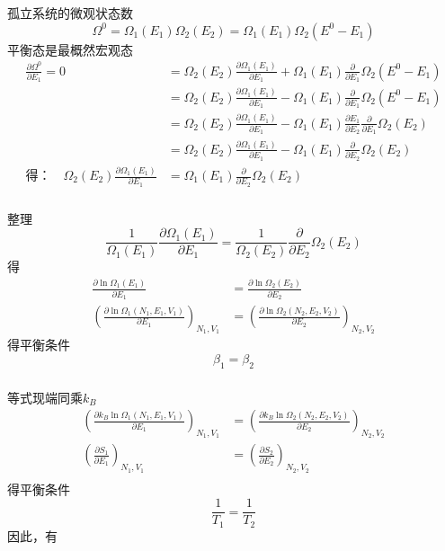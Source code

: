 \begin{frame}
  \frametitle{}
  孤立系统的微观状态数
  \[ \Omega^0 = \Omega _1 (E_1)\Omega _2 (E_2) = \Omega _1 (E_1)\Omega _2 (E^0 - E_1) \]
  平衡态是最概然宏观态
  \[ 
  \begin{aligned}
   \frac{\partial \Omega^0 }{\partial E_1 } =0 &= \Omega _2 (E_2) \frac{\partial \Omega _1 (E_1) }{\partial E_1 }  + \Omega _1 (E_1)\frac{\partial }{\partial E_1 }\Omega _2 (E^0 - E_1) \\
   &= \Omega _2 (E_2) \frac{\partial \Omega _1 (E_1) }{\partial E_1 }  - \Omega _1 (E_1)\frac{\partial }{\partial E_1 }\Omega _2 (E^0 - E_1) \\
   &= \Omega _2 (E_2) \frac{\partial \Omega _1 (E_1) }{\partial E_1 }  - \Omega _1 (E_1) \frac{\partial E_1 }{\partial E_2 } \frac{\partial }{\partial E_1 }\Omega _2 (E_2)  \\
   &=  \Omega _2 (E_2) \frac{\partial \Omega _1 (E_1) }{\partial E_1 }  - \Omega _1 (E_1) \frac{\partial }{\partial E_2 }\Omega _2 (E_2)  \\
  \text{得：} \quad \Omega _2 (E_2) \frac{\partial \Omega _1 (E_1) }{\partial E_1 }  &= \Omega _1 (E_1) \frac{\partial }{\partial E_2 }\Omega _2 (E_2) 
  \end{aligned}\]
\end{frame} 

\begin{frame}
  \frametitle{}
整理
$$
 \frac{1}{\Omega _1 (E_1) }\frac{\partial \Omega _1 (E_1) }{\partial E_1 }  = \frac{1}{\Omega _2 (E_2)} \frac{\partial }{\partial E_2 }\Omega _2 (E_2) 
$$ 
得
$$
\begin{aligned}
\frac{\partial \ln \Omega _1 (E_1) }{\partial E_1 }  &= \frac{\partial \ln \Omega _2 (E_2)}{\partial E_2 } 
\\ 
\left(\frac{\partial \ln \Omega _1 (N_1,E_1,V_1) }{\partial E_1 }\right)_{N_1,V_1}  &= \left(\frac{\partial \ln \Omega _2 (N_2,E_2,V_2)}{\partial E_2 } \right)_{N_2,V_2}  
\end{aligned}$$ 
得平衡条件 
\[ \beta _1 = \beta _2\]
\end{frame} 

\begin{frame}
  \frametitle{}
  等式现端同乘$k_B$
  $$
  \begin{aligned}
  \left(\frac{\partial k_B \ln \Omega _1 (N_1,E_1,V_1) }{\partial E_1 }\right)_{N_1,V_1}  &= \left(\frac{\partial k_B \ln \Omega _2 (N_2,E_2,V_2)}{\partial E_2 } \right)_{N_2,V_2}  \\
  \left(\frac{\partial S_1 }{\partial E_1 }\right)_{N_1,V_1}  &= \left(\frac{\partial S_2}{\partial E_2 } \right)_{N_2,V_2}  \\
  \end{aligned}$$ 
  得平衡条件
  \[\frac{1}{T_1} = \frac{1}{T_2}\]
  因此，有
 
\end{frame} 

